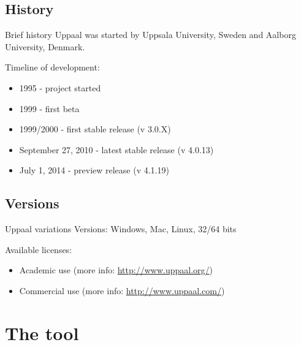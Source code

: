 \documentclass{beamer}
\begin{document}
\subsection{History}
\begin{frame}{Brief history}
	Uppaal was started by Uppsala University, Sweden and Aalborg University, Denmark.
	
	Timeline of development:
	\begin{itemize}
		\item 1995 - project started
		\item 1999 - first beta
		\item 1999/2000 - first stable release (v 3.0.X)
		\item September 27, 2010 - latest stable release (v 4.0.13)
		\item July 1, 2014 - preview release (v 4.1.19)
	\end{itemize}
	
\end{frame}

\subsection{Versions}
\begin{frame}{Uppaal variations}
	Versions: Windows, Mac, Linux, 32/64 bits
	
	Available licenses:
	\begin{itemize}
		\item Academic use (more info: \href{http://www.uppaal.org/}{http://www.uppaal.org/})
		\item Commercial use (more info: \href{http://www.uppaal.com/}{http://www.uppaal.com/})
	\end{itemize}
\end{frame}

\section{The tool}
\end{document}
